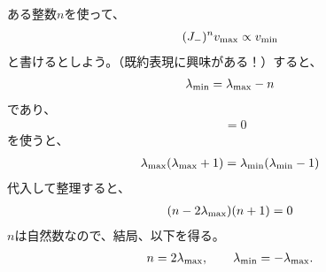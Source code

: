 \documentclass[10pt,a4paper]{jarticle}
\begin{document}
ある整数$n$を使って、
\begin{align}
(J_-)^n v_{\rm max} \propto v_{\rm min}
\end{align}
と書けるとしよう。（既約表現に興味がある！）すると、
\begin{align}
\lambda_{\rm min} = \lambda_{\rm max} - n
\end{align}
であり、
\begin{align}
[J_\pm, J_1^2 + J_2^2 + J_3^2] &= 0
\end{align}
を使うと、
\begin{align}
\lambda_{\rm max} (\lambda_{\rm max}+1)
=
\lambda_{\rm min} (\lambda_{\rm min}-1)
\end{align}
代入して整理すると、
\begin{align}
(n-2\lambda_{\rm max})(n+1) = 0
\end{align}
$n$は自然数なので、結局、以下を得る。
\begin{align}
n = 2\lambda_{\rm max}, \qquad
\lambda_{\rm min} = -\lambda_{\rm max}.
\end{align}
\end{document}
